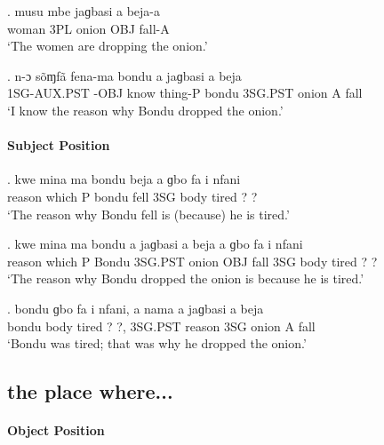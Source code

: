 \documentclass{assets/fieldnotes}
\begin{document}
{\exg.
musu    mbe    jaɡbasi   a     beja-a \\
woman   3PL   onion     OBJ   fall-A \\%
`The women are dropping the onion.' \label{The women are dropping the onion}


\exg.
n-ɔ      sõɱfã   fena-ma   bondu   a     jaɡbasi   a   beja \\
1SG-AUX.PST -OBJ   know     thing-P      bondu   3SG.PST   onion     A   fall \\%
`I know the reason why Bondu dropped the onion.'

\paragraph*{Subject Position}

\exg.
kwe   mina ma   bondu   beja   a     ɡbo    fa      i   nfani \\
reason  which P   bondu   fell   3SG   body   tired   ?   ?     \\
`The reason why Bondu fell is (because) he is tired.'

\exg.
kwe   mina ma   bondu   a     jaɡbasi   a     beja   a     ɡbo    fa      i   nfani \\
reason     which P   Bondu   3SG.PST   onion     OBJ   fall   3SG   body   tired   ?   ?     \\
`The reason why Bondu dropped the onion is because he is tired.'

\exg.
bondu   ɡbo    fa      i   nfani,   a     nama     a     jaɡbasi   a   beja \\
bondu   body   tired   ?   ?,       3SG.PST   reason   3SG   onion     A   fall \\%
`Bondu was tired; that was why he dropped the onion.'

\subsection*{the place where...}

\paragraph*{Object Position}

}
\end{document}
